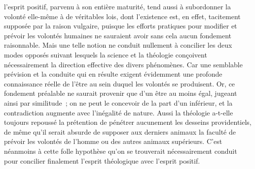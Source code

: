 \documentclass[french,twoside]{book} %
\begin{document}
l’esprit positif, parvenu à son entière maturité, tend aussi à subordonner la volonté elle-même à de véritables lois, dont l’existence est, en effet, tacitement supposée par la raison vulgaire, puisque les efforts pratiques pour modifier et prévoir les volontés humaines ne sauraient avoir sans cela aucun fondement raisonnable. Mais une telle notion ne conduit nullement à concilier les deux modes opposés suivant lesquels la science et la théologie conçoivent nécessairement la direction effective des divers phénomènes. Car une semblable prévision et la conduite qui en résulte exigent évidemment une profonde connaissance réelle de l’être au sein duquel les volontés se produisent. Or, ce fondement préalable ne saurait provenir que d’un être au moins égal, jugeant ainsi par similitude ; on ne peut le concevoir de la part d’un inférieur, et la contradiction augmente avec l’inégalité de nature. Aussi la théologie a-t-elle toujours repoussé la prétention de pénétrer aucunement les desseins providentiels, de même qu’il serait absurde de supposer aux derniers animaux la faculté de prévoir les volontés de l’homme ou des autres animaux supérieurs. C’est néanmoins à cette folle hypothèse qu’on se trouverait nécessairement conduit pour concilier finalement l’esprit théologique avec l’esprit positif.\par
\end{document}
